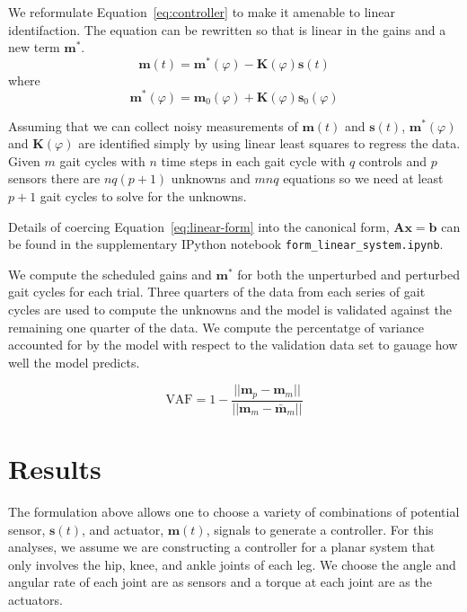 \documentclass{article}
\begin{document}
We reformulate Equation~\ref{eq:controller} to make it amenable to linear
identifaction. The equation can be rewritten so that is linear in the gains and
a new term $\mathbf{m}^*$.
%
\begin{equation}
  \mathbf{m}(t) = \mathbf{m}^*(\varphi) - \mathbf{K}(\varphi) \mathbf{s}(t)
  \label{eq:linear-form}
\end{equation}
%
where
%
\begin{equation}
  \mathbf{m}^*(\varphi) = \mathbf{m}_0(\varphi) + \mathbf{K}(\varphi) \mathbf{s}_0(\varphi)
\end{equation}

Assuming that we can collect noisy measurements of $\mathbf{m}(t)$
and $\mathbf{s}(t)$, $\mathbf{m}^*(\varphi)$ and $\mathbf{K}(\varphi)$ are
identified simply by using linear least squares to regress the data. Given $m$
gait cycles with $n$ time steps in each gait cycle with $q$ controls and $p$
sensors there are $nq(p + 1)$ unknowns and $mnq$ equations so we need at least
$p + 1$ gait cycles to solve for the unknowns.

Details of coercing Equation~\ref{eq:linear-form} into the canonical form,
$\mathbf{Ax}=\mathbf{b}$ can be found in the supplementary IPython notebook
\verb|form_linear_system.ipynb|.

We compute the scheduled gains and $\mathbf{m}^*$ for both the unperturbed and
perturbed gait cycles for each trial. Three quarters of the data from each
series of gait cycles are used to compute the unknowns and the model is
validated against the remaining one quarter of the data. We compute the
percentatge of variance accounted for by the model with respect to the
validation data set to gauage how well the model predicts.

\begin{equation}
  \textrm{VAF} = 1 - \frac{||\mathbf{m}_p - \mathbf{m}_m||}
    {||\mathbf{m}_m - \bar{\mathbf{m}}_m||}
  \label{eq:vaf}
\end{equation}

\section*{Results}
%
The formulation above allows one to choose a variety of combinations of
potential sensor, $\mathbf{s}(t)$, and actuator, $\mathbf{m}(t)$, signals to
generate a controller. For this analyses, we assume we are constructing a
controller for a planar system that only involves the hip, knee, and ankle
joints of each leg. We choose the angle and angular rate of each joint are as
sensors and a torque at each joint are as the actuators.
\end{document}
